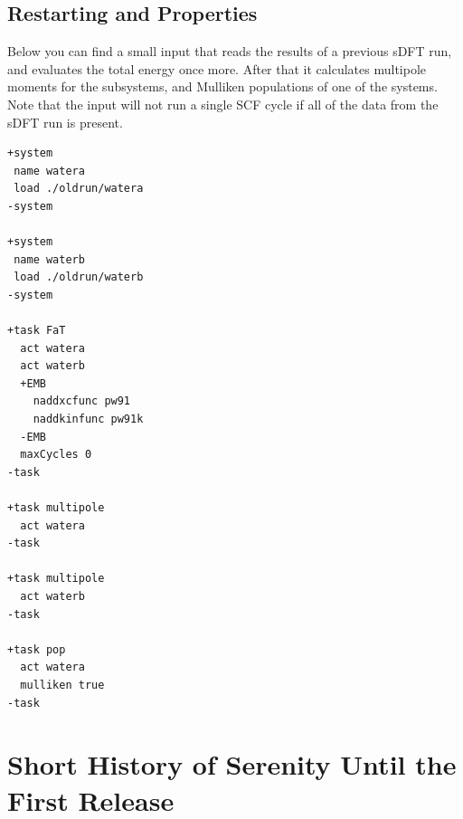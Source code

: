 \documentclass[bibliography=totocnumbered,a4paper,10pt]{scrartcl}
\begin{document}
\subsection{Restarting and Properties}
Below you can find a small input that reads the results of a previous sDFT run, and evaluates the total energy once more.
After that it calculates multipole moments for the subsystems, and Mulliken populations of one of the systems. 
Note that the input will not run a single SCF cycle if all of the data from the sDFT run is present.
\begin{lstlisting}
+system
 name watera
 load ./oldrun/watera
-system

+system
 name waterb
 load ./oldrun/waterb
-system

+task FaT
  act watera
  act waterb
  +EMB
    naddxcfunc pw91
    naddkinfunc pw91k
  -EMB
  maxCycles 0
-task

+task multipole
  act watera
-task

+task multipole
  act waterb
-task

+task pop
  act watera
  mulliken true
-task
\end{lstlisting}
\clearpage
\section{Short History of Serenity Until the First Release}  
\end{document}
